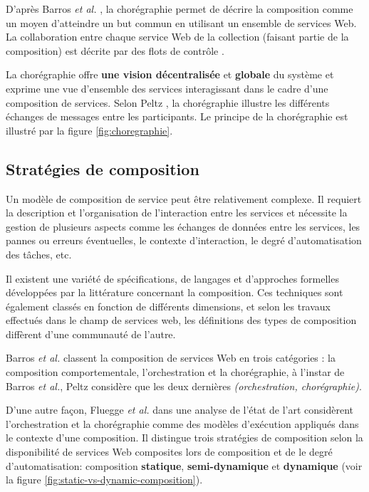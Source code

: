     D'après Barros \emph{et al.} \cite{barros2006standards}, la
    chorégraphie permet de décrire la composition comme un moyen
    d'atteindre un but commun en utilisant un ensemble de services
    Web. La collaboration entre chaque service Web de la collection
    (faisant partie de la composition) est décrite par des flots de
    contrôle \cite{lopez2008selection}.\medskip

    La chorégraphie offre \textbf{une vision décentralisée} et
    \textbf{globale} du système et exprime une vue d'ensemble des
    services interagissant dans le cadre d'une composition de
    services. Selon Peltz \cite{peltz2003web}, la chorégraphie
    illustre les différents échanges de messages entre les
    participants. Le principe de la chorégraphie est illustré par la
    figure \ref{fig:choregraphie}.

  \subsection{Stratégies de composition}
  \label{sec:types-de-composition}
  Un modèle de composition de service peut être relativement
  complexe. Il requiert la description et l'organisation de
  l'interaction entre les services et nécessite la gestion de
  plusieurs aspects comme les échanges de données entre les services,
  les pannes ou erreurs éventuelles, le contexte d'interaction, le
  degré d'automatisation des tâches, etc. \medskip

  Il existent une variété de spécifications, de langages et
  d'approches formelles développées par la littérature concernant la
  composition. Ces techniques sont également classés en fonction de
  différents dimensions, et selon les travaux effectués dans le champ
  de services web, les définitions des types de composition diffèrent
  d'une communauté de l'autre.\medskip

  Barros \emph{et al.} \cite{barros2006standards} classent la
  composition de services Web en trois catégories : la composition
  comportementale, l'orchestration et la chorégraphie, à l'instar de
  Barros \emph{et al.}, Peltz \cite{peltz2003web} considère que les
  deux dernières \textit{(orchestration, chorégraphie)}.\medskip

  

  D'une autre façon, Fluegge \emph{et al.}\cite{fluegge2006challenges}
  dans une analyse de l'état de l'art considèrent l'orchestration et
  la chorégraphie comme des modèles d'exécution appliqués dans le
  contexte d'une composition. Il distingue trois stratégies de
  composition selon la disponibilité de services Web composites lors
  de composition et de le degré d'automatisation: composition
  \textbf{statique}, \textbf{semi-dynamique} et \textbf{dynamique}
  (voir la figure \ref{fig:static-vs-dynamic-composition}).


